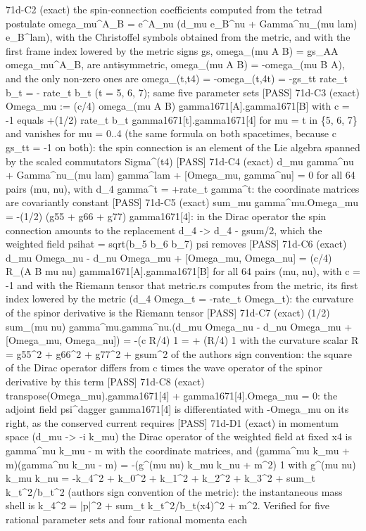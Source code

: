 \documentclass[
  10pt,
]{article}
\newenvironment{Shaded}{}{}
\newcommand{\NormalTok}[1]{#1}
\begin{document}
\begin{Shaded}
\begin{Highlighting}[]
\NormalTok{[PASS] 71d{-}C2  (exact) the spin{-}connection coefficients computed from the tetrad postulate omega\_mu\^{}A\_B = e\^{}A\_nu (d\_mu e\_B\^{}nu + Gamma\^{}nu\_(mu lam) e\_B\^{}lam), with the Christoffel symbols obtained from the metric, and with the first frame index lowered by the metric signs gs, omega\_(mu A B) = gs\_AA omega\_mu\^{}A\_B, are antisymmetric, omega\_(mu A B) = {-}omega\_(mu B A), and the only non{-}zero ones are omega\_(t,t4) = {-}omega\_(t,4t) = {-}gs\_tt rate\_t b\_t = {-} rate\_t b\_t (t = 5, 6, 7); same five parameter sets}
\NormalTok{[PASS] 71d{-}C3  (exact) Omega\_mu := (c/4) omega\_(mu A B) gamma1671[A].gamma1671[B] with c = {-}1 equals +(1/2) rate\_t b\_t gamma1671[t].gamma1671[4] for mu = t in \{5, 6, 7\} and vanishes for mu = 0..4 (the same formula on both spacetimes, because c gs\_tt = {-}1 on both): the spin connection is an element of the Lie algebra spanned by the scaled commutators Sigma\^{}(t4)}
\NormalTok{[PASS] 71d{-}C4  (exact) d\_mu gamma\^{}nu + Gamma\^{}nu\_(mu lam) gamma\^{}lam + [Omega\_mu, gamma\^{}nu] = 0 for all 64 pairs (mu, nu), with d\_4 gamma\^{}t = +rate\_t gamma\^{}t: the coordinate matrices are covariantly constant}
\NormalTok{[PASS] 71d{-}C5  (exact) sum\_mu gamma\^{}mu.Omega\_mu = {-}(1/2) (g55 + g66 + g77) gamma1671[4]: in the Dirac operator the spin connection amounts to the replacement d\_4 {-}\textgreater{} d\_4 {-} gsum/2, which the weighted field psihat = sqrt(b\_5 b\_6 b\_7) psi removes}
\NormalTok{[PASS] 71d{-}C6  (exact) d\_mu Omega\_nu {-} d\_nu Omega\_mu + [Omega\_mu, Omega\_nu] = (c/4) R\_(A B mu nu) gamma1671[A].gamma1671[B] for all 64 pairs (mu, nu), with c = {-}1 and with the Riemann tensor that metric.rs computes from the metric, its first index lowered by the metric (d\_4 Omega\_t = {-}rate\_t Omega\_t): the curvature of the spinor derivative is the Riemann tensor}
\NormalTok{[PASS] 71d{-}C7  (exact) (1/2) sum\_(mu nu) gamma\^{}mu.gamma\^{}nu.(d\_mu Omega\_nu {-} d\_nu Omega\_mu + [Omega\_mu, Omega\_nu]) = {-}(c R/4) 1 = + (R/4) 1 with the curvature scalar R = g55\^{}2 + g66\^{}2 + g77\^{}2 + gsum\^{}2 of the author\textquotesingle{}s sign convention: the square of the Dirac operator differs from c times the wave operator of the spinor derivative by this term}
\NormalTok{[PASS] 71d{-}C8  (exact) transpose(Omega\_mu).gamma1671[4] + gamma1671[4].Omega\_mu = 0: the adjoint field psi\^{}dagger gamma1671[4] is differentiated with {-}Omega\_mu on its right, as the conserved current requires}
\NormalTok{[PASS] 71d{-}D1  (exact) in momentum space (d\_mu {-}\textgreater{} {-}i k\_mu) the Dirac operator of the weighted field at fixed x4 is gamma\^{}mu k\_mu {-} m with the coordinate matrices, and (gamma\^{}mu k\_mu + m)(gamma\^{}nu k\_nu {-} m) = {-}(g\^{}(mu nu) k\_mu k\_nu + m\^{}2) 1 with g\^{}(mu nu) k\_mu k\_nu = {-}k\_4\^{}2 + k\_0\^{}2 + k\_1\^{}2 + k\_2\^{}2 + k\_3\^{}2 + sum\_t k\_t\^{}2/b\_t\^{}2 (author\textquotesingle{}s sign convention of the metric): the instantaneous mass shell is k\_4\^{}2 = |p|\^{}2 + sum\_t k\_t\^{}2/b\_t(x4)\^{}2 + m\^{}2. Verified for five rational parameter sets and four rational momenta each}

\end{Highlighting}
\end{Shaded}
\end{document}

